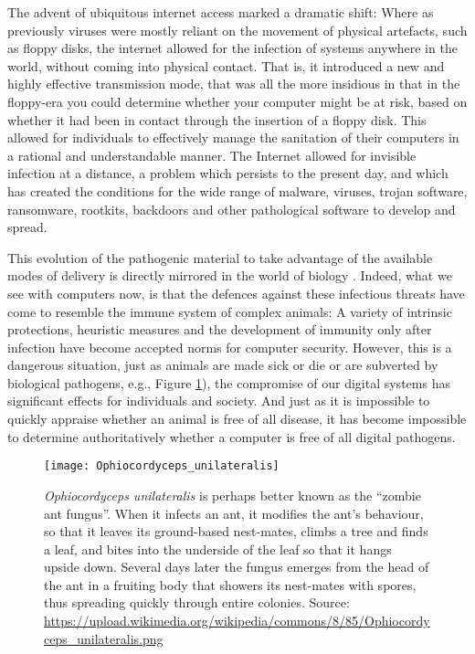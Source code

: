 The advent of ubiquitous internet access marked a dramatic shift:  Where as previously viruses were mostly reliant on the
movement of physical artefacts, such as floppy disks, the internet allowed for the infection of systems anywhere in the
world, without coming into physical contact.
That is, it introduced a new and highly effective transmission mode, that was all the more insidious in that in the floppy-era
you could determine whether your computer might be at risk, based on whether it had been in contact through the insertion of
a floppy disk.
This allowed for individuals to effectively manage the sanitation of their computers in a rational and understandable manner.
The Internet allowed for invisible infection at a distance, a problem which persists to the present day, and which has created
the conditions for the wide range of malware, viruses, trojan software, ransomware, rootkits, backdoors and other pathological
software to develop and spread.

This evolution of the pathogenic material to take advantage of the available modes of delivery is directly mirrored in the
world of biology \cite{antonovics2017evolution}.
Indeed, what we see with computers now, is that the defences against these infectious threats have come to resemble the
immune system of complex animals: A variety of intrinsic protections, heuristic measures and the development of immunity only
after infection have become accepted norms for computer security.
However, this is a dangerous situation, just as animals are made sick or die or are subverted by biological pathogens, e.g., Figure \ref{fig:antzombies}), the compromise of our digital systems has significant effects for individuals and society.  And just as it is impossible to quickly
appraise whether an animal is free of all disease, it has become impossible to determine authoritatively whether a computer
is free of all digital pathogens.

\begin{figure}
  \centering
  \texttt{[image: Ophiocordyceps\_unilateralis]}
  \caption{
    {\em Ophiocordyceps unilateralis} is perhaps better known as the ``zombie ant fungus''.  When it infects an ant,
    it modifies the ant's behaviour, so that it leaves its ground-based nest-mates, climbs a tree and finds a leaf,
    and bites into the underside of the leaf so that it hangs upside down. Several days later the fungus emerges from
    the head of the ant in a fruiting body that showers its nest-mates with spores, thus spreading quickly through
    entire colonies.  Source: 
    \url{https://upload.wikimedia.org/wikipedia/commons/8/85/Ophiocordyceps_unilateralis.png}
    \label{fig:antzombies}
  }
    
\end{figure}

